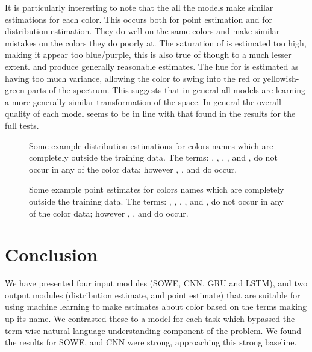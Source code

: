 It is particularly interesting to note that the all the models make similar estimations for each color.
This occurs both for point estimation and for distribution estimation.
They do well on the same colors and make similar mistakes on the colors they do poorly at.
The saturation of  is estimated too high, making it appear too blue/purple, this is also true of  though to a much lesser extent.
 and  produce generally reasonable estimates.
The hue for  is estimated as having too much variance, allowing the color to swing into the red or yellowish-green parts of the spectrum.
This suggests that in general all models are learning a more generally similar transformation of the space.
In general the overall quality of each model seems to be in line with that found in the results for the full tests.


\begin{figure}
	\caption{Some example distribution estimations for colors names which are completely outside the training data. The terms: , , , , and , do not occur in any of the color data; however ,  , and  do occur.} \label{fig:oovdist}
\end{figure}

\begin{figure}
	\caption{Some example point estimates for colors names which are completely outside the training data. The terms: , , , , and , do not occur in any of the color data; however ,  , and  do occur.} \label{fig:oovpoint}
\end{figure}



\section{Conclusion}
We have presented four input modules (SOWE, CNN, GRU and LSTM),
and two output modules (distribution estimate, and point estimate)
that are suitable for using machine learning to make estimates about color based on the terms making up its name.
We contrasted these to a \empmodel{} model for each task which bypassed the term-wise natural language understanding component of the problem.
We found the results for SOWE, and CNN were strong, approaching this strong baseline.

